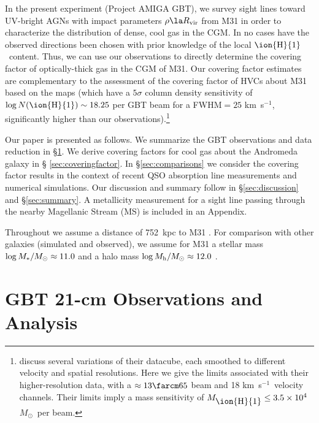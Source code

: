 \documentclass[12pt,preprint]{aastex6}
\newcommand{\andromedadistance}{752}
\newcommand{\HI}{\ensuremath{\mbox{\ion{H}{1}}}}
\newcommand{\logNHI}{\ensuremath{\log N(\mbox{\ion{H}{1}})}\relax}
\newcommand{\Rvir}{\ensuremath{R_{\rm vir}}\relax}
\newcommand{\msun}{\ensuremath{M_\odot}\relax}
\newcommand{\kms}{km~s$^{-1}$}
\begin{document}
In the present experiment (Project AMIGA GBT), we survey sight lines
toward UV-bright AGNs with impact parameters $\rho \la \Rvir$ from M31
in order to characterize the distribution of dense, cool gas in the
CGM. In no cases have the observed directions been chosen with prior
knowledge of the local \HI\ content. Thus, we can use our observations
to directly determine the covering factor of optically-thick gas in
the CGM of M31. Our covering factor estimates are complementary to the
\citet{richter2012} assessment of the covering factor of HVCs about
M31 based on the \citet{thilker2004} maps (which have a $5\sigma$
column density sensitivity of $\logNHI \sim18.25$ per GBT beam for a
FWHM$ = 25$ \kms, significantly higher than our
observations).\footnote{\citet{thilker2004} discuss several variations
  of their datacube, each smoothed to different velocity and spatial
  resolutions. Here we give the limits associated with their
  higher-resolution data, with a $\approx13\farcm65$ beam and 18 \kms\
  velocity channels. Their limits imply a mass sensitivity of
  $M_{\HI} \le 3.5\times 10^{4}$ \msun\ per beam.}

Our paper is presented as follows. We summarize the GBT observations
and data reduction in \S \ref{sec:observations}. We derive covering
factors for cool gas about the Andromeda galaxy in \S
\ref{sec:coveringfactor}. In \S \ref{sec:comparisons} we consider the
covering factor results in the context of recent QSO absorption line
measurements and numerical simulations. Our discussion and summary
follow in \S \ref{sec:discussion} and \S \ref{sec:summary}. A
metallicity measurement for a sight line passing through the nearby
Magellanic Stream (MS) is included in an Appendix.

Throughout we assume a distance of \andromedadistance\ kpc to M31
\citep{riess2012}. For comparison with other galaxies (simulated and
observed), we assume for M31 a stellar mass
$\log M_*/\msun \approx 11.0$ and a halo mass
$\log M_{\rm h}/\msun \approx 12.0$ \citep{tamm2012}.



\section{GBT 21-cm Observations and Analysis}
\label{sec:observations}
\end{document}
